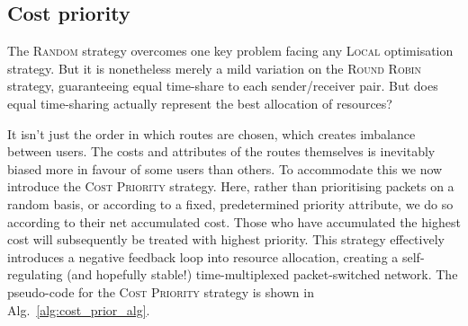 \documentclass[aps, rmp, twocolumn, amsmath, amssymb, nofootinbib, superscriptaddress, longbibliography, floatfix, table-of-contents, eqsecnum]{revtex4-1}
\begin{document}
%
%

\subsection{Cost priority} \label{sec:cost_priority} 

The \textsc{Random} strategy overcomes one key problem facing any \textsc{Local} optimisation strategy. But it is nonetheless merely a mild variation on the \textsc{Round Robin} strategy, guaranteeing equal time-share to each sender/receiver pair. But does equal time-sharing actually represent the best allocation of resources?

It isn't just the order in which routes are chosen, which creates imbalance between users. The costs and attributes of the routes themselves is inevitably biased more in favour of some users than others. To accommodate this we now introduce the \textsc{Cost Priority} strategy. Here, rather than prioritising packets on a random basis, or according to a fixed, predetermined priority attribute, we do so according to their net accumulated cost. Those who have accumulated the highest cost will subsequently be treated with highest priority. This strategy effectively introduces a negative feedback loop into resource allocation, creating a self-regulating (and hopefully stable!) time-multiplexed packet-switched network. The pseudo-code for the \textsc{Cost Priority} strategy is shown in Alg.~\ref{alg:cost_prior_alg}.
\end{document}
